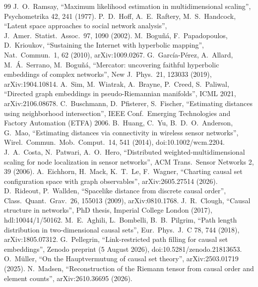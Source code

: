 \documentclass[11pt,a4paper]{article}
\begin{document}
\begin{thebibliography}{99}
 J.~O.~Ramsay, ``Maximum likelihood estimation in multidimensional scaling'', Psychometrika 42, 241 (1977).
 P.~D.~Hoff, A.~E.~Raftery, M.~S.~Handcock, ``Latent space approaches to social network analysis'', J.\ Amer.\ Statist.\ Assoc.\ 97, 1090 (2002).
 M.~Bogu\~n\'a, F.~Papadopoulos, D.~Krioukov, ``Sustaining the Internet with hyperbolic mapping'', Nat.\ Commun.\ 1, 62 (2010), arXiv:1009.0267.
 G.~Garc\'ia-P\'erez, A.~Allard, M.~\'A.~Serrano, M.~Bogu\~n\'a, ``Mercator: uncovering faithful hyperbolic embeddings of complex networks'', New J.\ Phys.\ 21, 123033 (2019), arXiv:1904.10814.
 A.~Sim, M.~Wiatrak, A.~Brayne, P.~Creed, S.~Paliwal, ``Directed graph embeddings in pseudo-Riemannian manifolds'', ICML 2021, arXiv:2106.08678.
 C.~Buschmann, D.~Pfisterer, S.~Fischer, ``Estimating distances using neighborhood intersection'', IEEE Conf.\ Emerging Technologies and Factory Automation (ETFA) 2006.
 B.~Huang, C.~Yu, B.~D.~O.~Anderson, G.~Mao, ``Estimating distances via connectivity in wireless sensor networks'', Wirel.\ Commun.\ Mob.\ Comput.\ 14, 541 (2014), doi:10.1002/wcm.2204.
 J.~A.~Costa, N.~Patwari, A.~O.~Hero, ``Distributed weighted-multidimensional scaling for node localization in sensor networks'', ACM Trans.\ Sensor Networks 2, 39 (2006).
 A.~Eichhorn, H.~Mack, K.~T.~Le, F.~Wagner, ``Charting causal set configuration space with graph observables'', arXiv:2605.27514 (2026).
 D.~Rideout, P.~Wallden, ``Spacelike distance from discrete causal order'', Class.\ Quant.\ Grav.\ 26, 155013 (2009), arXiv:0810.1768.
 J.~R.~Clough, ``Causal structure in networks'', PhD thesis, Imperial College London (2017), hdl:10044/1/50162.
 M.~E.~Aghili, L.~Bombelli, B.~B.~Pilgrim, ``Path length distribution in two-dimensional causal sets'', Eur.\ Phys.\ J.\ C 78, 744 (2018), arXiv:1805.07312.
 G.~Pellegrin, ``Link-restricted path filling for causal set embeddings'', Zenodo preprint (5 August 2026), doi:10.5281/zenodo.21813653.
 O.~M\"uller, ``On the Hauptvermutung of causal set theory'', arXiv:2503.01719 (2025).
 N.~Madsen, ``Reconstruction of the Riemann tensor from causal order and element counts'', arXiv:2610.36695 (2026).
\end{thebibliography}
\end{document}
